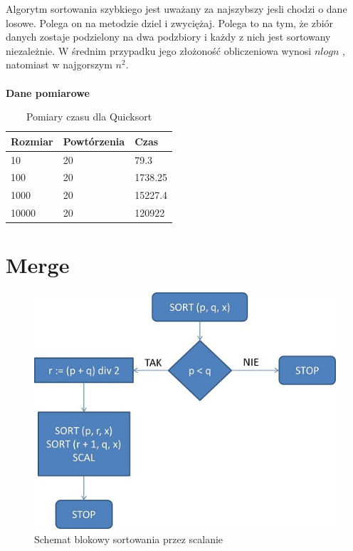 \documentclass[12pt,oneside]{mwbk}
\begin{document}
	\indent Algorytm sortowania szybkiego jest uważany za najszybszy jesli chodzi o dane losowe. Polega on na metodzie dziel i 			zwyciężaj. Polega to na tym, że zbiór danych zostaje podzielony na dwa podzbiory i każdy z nich jest sortowany niezależnie.
	W średnim przypadku jego złożoność obliczeniowa wynosi $nlogn$ , natomiast w najgorszym $n^{2}$.\\
	\\
	\textbf{Dane pomiarowe}
	\begin{table}[!h]
	\centering
	\begin{tabular}{| l | l | l |}
	\hline
	Rozmiar & Powtórzenia & Czas         \\ \hline
	10      & 20          & 79.3         \\ \hline
	100     & 20          & 1738.25      \\ \hline
	1000    & 20          & 15227.4      \\ \hline
	10000   & 20          & 120922       \\ \hline
	\end{tabular}
	\caption{Pomiary czasu dla Quicksort}
	\end{table}


\section {Merge}
	\begin{figure}[!h]
	\centering
	\includegraphics[scale=0.5]{rys/merge.jpg}
	\caption{Schemat blokowy sortowania przez scalanie}
	\end{figure}
\end{document}
